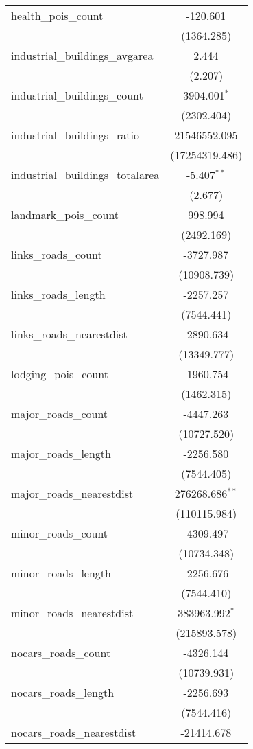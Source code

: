 \begin{table}[!htbp]
\begin{tabular}{@{\extracolsep{5pt}}lc}
 health_pois_count & -120.601$^{}$ \\
  & (1364.285) \\
 industrial_buildings_avgarea & 2.444$^{}$ \\
  & (2.207) \\
 industrial_buildings_count & 3904.001$^{*}$ \\
  & (2302.404) \\
 industrial_buildings_ratio & 21546552.095$^{}$ \\
  & (17254319.486) \\
 industrial_buildings_totalarea & -5.407$^{**}$ \\
  & (2.677) \\
 landmark_pois_count & 998.994$^{}$ \\
  & (2492.169) \\
 links_roads_count & -3727.987$^{}$ \\
  & (10908.739) \\
 links_roads_length & -2257.257$^{}$ \\
  & (7544.441) \\
 links_roads_nearestdist & -2890.634$^{}$ \\
  & (13349.777) \\
 lodging_pois_count & -1960.754$^{}$ \\
  & (1462.315) \\
 major_roads_count & -4447.263$^{}$ \\
  & (10727.520) \\
 major_roads_length & -2256.580$^{}$ \\
  & (7544.405) \\
 major_roads_nearestdist & 276268.686$^{**}$ \\
  & (110115.984) \\
 minor_roads_count & -4309.497$^{}$ \\
  & (10734.348) \\
 minor_roads_length & -2256.676$^{}$ \\
  & (7544.410) \\
 minor_roads_nearestdist & 383963.992$^{*}$ \\
  & (215893.578) \\
 nocars_roads_count & -4326.144$^{}$ \\
  & (10739.931) \\
 nocars_roads_length & -2256.693$^{}$ \\
  & (7544.416) \\
 nocars_roads_nearestdist & -21414.678$^{}$ \\

\end{tabular}
\end{table}
